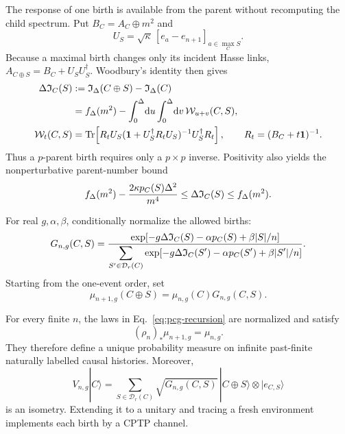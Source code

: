 The response of one birth is available from the parent without recomputing
the child spectrum.  Put \(B_C=A_C\oplus m^2\) and
\[
 U_S=\sqrt\kappa\,[e_a-e_{n+1}]_{a\in\max_C S}.
\]
Because a maximal birth changes only its incident Hasse links,
\(A_{C\oplus S}=B_C+U_SU_S^\dagger\).  Woodbury's identity then gives
\begin{align}
 \Delta\mathfrak I_C(S)
 &:=\mathfrak I_\Delta(C\oplus S)-\mathfrak I_\Delta(C)\nonumber\\
 &=f_\Delta(m^2)
 -\int_0^\Delta\!\mathrm d u\int_0^\Delta\!\mathrm d v\,
 \mathcal W_{u+v}(C,S),
 \label{eq:pcg-increment}\\
 \mathcal W_t(C,S)
 &=\operatorname{Tr}\!\left[
 R_tU_S(\mathbf1+U_S^\dagger R_tU_S)^{-1}
 U_S^\dagger R_t\right],
 \qquad R_t=(B_C+t\mathbf1)^{-1}.
 \label{eq:pcg-woodbury}
\end{align}
Thus a \(p\)-parent birth requires only a \(p\times p\) inverse.  Positivity
also yields the nonperturbative parent-number bound
\begin{equation}
 f_\Delta(m^2)-\frac{2\kappa p_C(S)\Delta^2}{m^4}
 \leq\Delta\mathfrak I_C(S)\leq f_\Delta(m^2).
 \label{eq:pcg-increment-bound}
\end{equation}

For real \(g,\alpha,\beta\), conditionally normalize the allowed births:
\begin{equation}
 G_{n,g}(C,S)=
 \frac{
 \exp[-g\Delta\mathfrak I_C(S)-\alpha p_C(S)+\beta|S|/n]}
 {\displaystyle\sum_{S'\in\mathcal D_r(C)}
 \exp[-g\Delta\mathfrak I_C(S')-\alpha p_C(S')+\beta|S'|/n]} .
 \label{eq:pcg-kernel}
\end{equation}
Starting from the one-event order, set
\begin{equation}
 \mu_{n+1,g}(C\oplus S)=\mu_{n,g}(C)G_{n,g}(C,S).
 \label{eq:pcg-recursion}
\end{equation}

\begin{theorem}
\label{thm:pcg-projective-law}
For every finite \(n\), the laws in
Eq.~\eqref{eq:pcg-recursion} are normalized and satisfy
\begin{equation}
 (\rho_n)_*\mu_{n+1,g}=\mu_{n,g}.
 \label{eq:pcg-projectivity}
\end{equation}
They therefore define a unique probability measure on infinite
past-finite naturally labelled causal histories.  Moreover,
\begin{equation}
 V_{n,g}|C\rangle=
 \sum_{S\in\mathcal D_r(C)}
 \sqrt{G_{n,g}(C,S)}\,
 |C\oplus S\rangle\otimes|e_{C,S}\rangle
 \label{eq:pcg-isometry}
\end{equation}
is an isometry.  Extending it to a unitary and tracing a fresh environment
implements each birth by a CPTP channel.
\end{theorem}


